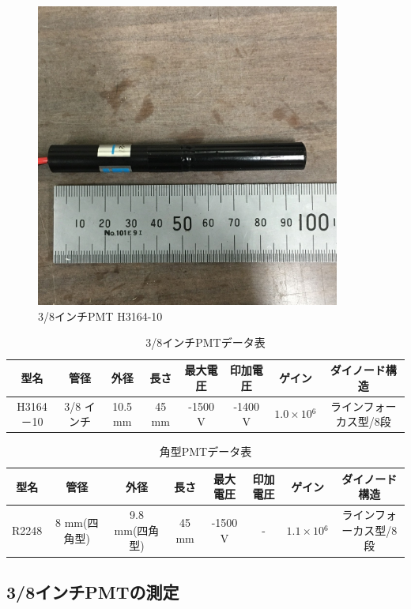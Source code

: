 \begin{figure}[tbp]
	\centering
		\includegraphics[width=10cm]{fig/iguchi/miniPMT.jpg}
	\caption{3/8インチPMT H3164-10}
	\label{3/8inch}
\end{figure}

\begin{table}[tbp]
	\centering
	
	  \begin{tabular}{cccccccc} \hline
		型名& 管径 & 外径 & 長さ & 最大電圧 & 印加電圧 & ゲイン & ダイノード構造 \\ \hline \hline
		H3164－10 & 3/8 インチ & 10.5 mm & 45 mm & -1500 V & -1400 V & $1.0\times10{^{6}}$ &ラインフォーカス型/8段　\\ \hline
	\end{tabular}
	  \caption{3/8インチPMTデータ表}
	  \label{3/8inchPMT}
\end{table}

\begin{table}[tbp]
	\centering
	  \begin{tabular}{cccccccc} \hline
		型名& 管径 & 外径 & 長さ & 最大電圧 & 印加電圧 & ゲイン & ダイノード構造 \\ \hline \hline
		R2248 & 8 mm(四角型) & 9.8 mm(四角型)& 45 mm & -1500 V & - & $1.1\times10{^{6}}$ &ラインフォーカス型/8段 \\ \hline
	\end{tabular}
	  \caption{角型PMTデータ表}
\end{table}


\subsection{3/8インチPMTの測定}

